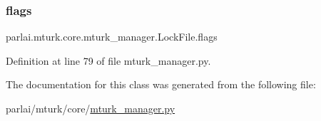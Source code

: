 \subsubsection{\texorpdfstring{flags}{flags}}
{\footnotesize\ttfamily parlai.\+mturk.\+core.\+mturk\+\_\+manager.\+Lock\+File.\+flags\hspace{0.3cm}{\ttfamily [static]}}



Definition at line 79 of file mturk\+\_\+manager.\+py.



The documentation for this class was generated from the following file\+:\begin{DoxyCompactItemize}
\item 
parlai/mturk/core/\hyperlink{mturk__manager_8py}{mturk\+\_\+manager.\+py}\end{DoxyCompactItemize}
